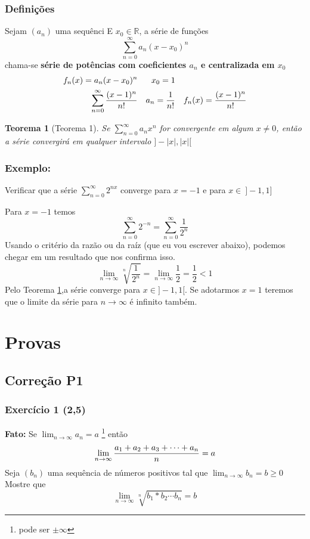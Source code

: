 \documentclass[12pt,openany]{book}
\newtheorem{theorem}{Teorema}[section]
\newcommand{\LI}[1][n]{\lim_{{#1} \rightarrow \infty}}
\newcommand{\soma}[2][n]{\sum_{{#1} = #2}^\infty}
\newcommand{\E}[1]{Exercício #1}
\begin{document}
{{\section{Definições}
Sejam $(a_n)$ uma sequênci E $x_0 \in \mathds{R}$, a série de funções $$\soma{0} a_n (x-x_0)^n$$ chama-se \textbf{série de potências com coeficientes $a_n$ e centralizada em $x_0$} 
\begin{align*}
f_n(x) = a_n (x-x_0)^n & & x_0 =1\\
\soma{0} {(x-1)^n \over n!} & & a_n = \frac{1}{n!} &  & f_n(x) = {(x-1)^n \over n!}
\end{align*}

\begin{theorem}[Teorema 1]\label{T:5-1}
Se $\displaystyle{\soma{0} a_n x^n}$ for convergente em algum $x \neq 0$, então a série convergirá em qualquer  intervalo $]-|x|, |x|[$
\end{theorem}

\section*{\textbf{Exemplo:}}{ Verificar que a série $\displaystyle{\soma{0} 2^{nx}}$ converge para $x = -1$ e para $x \in \ ]-1,1]$}

Para $x = -1$ temos $$\soma{0} 2^{-n} = \soma{0} \frac{1}{2^n}$$ Usando o critério da razão ou da raíz (que eu vou escrever abaixo), podemos chegar em um resultado que nos confirma isso. $$\LI \sqrt[n]{\frac{1}{2^n}} = \LI \frac{1}{2} = \frac{1}{2} < 1$$ Pelo Teorema \ref{T:5-1},a série converge para $x \in ]-1,1[$. Se adotarmos $x= 1$ teremos que o limite da série para $n \rightarrow \infty$ é infinito também.

\part{Provas} 
\chapter{Correção P1}
\label{C:P1}

\section*{\E{1} (2,5)}{\textbf{Fato:} Se $\displaystyle{\LI a_n = a}$ \footnote{pode ser $\pm \infty$} então $$\LI {a_1 + a_2 + a_3 + \cdots + a_n \over n} = a$$ Seja $(b_n)$ uma sequência de números positivos tal que $\displaystyle{\LI b_n = b \geq 0}$ Mostre que $$\LI \sqrt[n]{b_1*b_2\cdots b_n} = b $$}

}}
\end{document}
